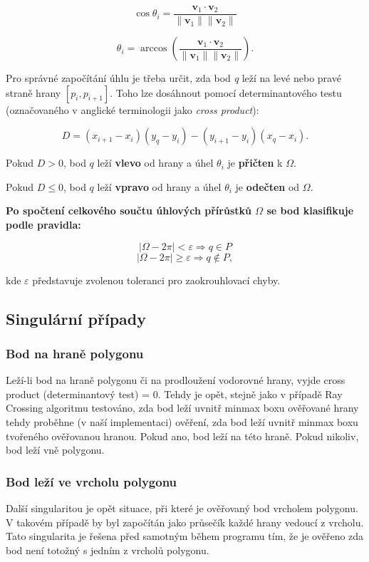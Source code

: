 \documentclass[a4paper,12pt]{article}
\begin{document}
\[
\cos \theta_i = \frac{\mathbf{v}_1 \cdot \mathbf{v}_2}{\|\mathbf{v}_1\| \|\mathbf{v}_2\|}
\]

\[
\theta_i = \arccos \left( \frac{\mathbf{v}_1 \cdot \mathbf{v}_2}{\|\mathbf{v}_1\| \|\mathbf{v}_2\|} \right).
\]


Pro správné započítání úhlu je třeba určit, zda bod \textit{q} leží na levé nebo pravé straně hrany \( [p_i, p_{i+1}] \). Toho lze dosáhnout pomocí determinantového testu (označovaného v anglické terminologii jako \textit{cross product}):

\[
D = (x_{i+1} - x_i)(y_q - y_i) - (y_{i+1} - y_i)(x_q - x_i).
\]

Pokud \( D > 0 \), bod \( q \) leží \textbf{vlevo} od hrany a úhel \( \theta_i \) je \textbf{přičten} k \( \Omega \).

Pokud \( D \leq 0 \), bod \( q \) leží \textbf{vpravo} od hrany a úhel \( \theta_i \) je \textbf{odečten} od \( \Omega \).


\textbf{Po spočtení celkového součtu úhlových přírůstků \( \Omega \) se bod klasifikuje podle pravidla:}

\[
\left| \Omega - 2\pi \right| < \varepsilon \Rightarrow q \in P
\]
\[
\left| \Omega - 2\pi \right| \geq \varepsilon \Rightarrow q \notin P,
\]

kde \( \varepsilon \) představuje zvolenou toleranci pro zaokrouhlovací chyby.

\subsection{Singulární případy}
\subsubsection{Bod na hraně polygonu}
Leží-li bod na hraně polygonu či na prodloužení vodorovné hrany, vyjde cross product (determinantový test) = 0. Tehdy je opět, stejně jako v případě Ray Crossing algoritmu testováno, zda bod leží uvnitř minmax boxu ověřované hrany
tehdy proběhne (v naší implementaci) ověření, zda bod leží uvnitř minmax boxu tvořeného ověřovanou hranou. Pokud ano, bod leží na této hraně. Pokud nikoliv, bod leží vně polygonu.

\subsubsection{Bod leží ve vrcholu polygonu}
Další singularitou je opět situace, při které je ověřovaný bod vrcholem polygonu. V takovém případě by byl započítán jako průsečík každé hrany vedoucí z vrcholu. Tato singularita je řešena před samotným během programu tím, že je ověřeno zda bod není totožný s jedním z vrcholů polygonu.
\end{document}
